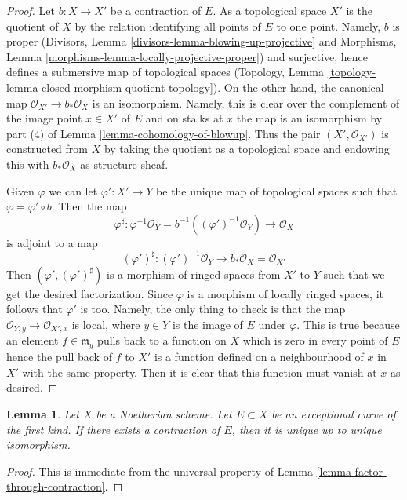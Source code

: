 \documentclass{stacks-project}
\theoremstyle{plain}
\newtheorem{lemma}[subsection]{Lemma}
\theoremstyle{definition}
\theoremstyle{remark}
\numberwithin{equation}{subsection}
\begin{document}
\begin{proof}
Let $b : X \to X'$ be a contraction of $E$. As a topological space
$X'$ is the quotient of $X$ by the relation identifying all points
of $E$ to one point. Namely, $b$ is proper
(Divisors, Lemma \ref{divisors-lemma-blowing-up-projective} and
Morphisms, Lemma \ref{morphisms-lemma-locally-projective-proper})
and surjective, hence defines a submersive map of topological
spaces (Topology, Lemma
\ref{topology-lemma-closed-morphism-quotient-topology}).
On the other hand, the canonical map
$\mathcal{O}_{X'} \to b_*\mathcal{O}_X$ is an isomorphism. Namely,
this is clear over the complement of the image point $x \in X'$ of $E$
and on stalks at $x$ the map is an isomorphism by part (4) of
Lemma \ref{lemma-cohomology-of-blowup}.
Thus the pair $(X', \mathcal{O}_{X'})$ is constructed
from $X$ by taking the quotient as a topological space
and endowing this with $b_*\mathcal{O}_X$ as structure sheaf.

\medskip\noindent
Given $\varphi$ we can let $\varphi' : X' \to Y$ be the unique map of
topological spaces such that $\varphi = \varphi' \circ b$.
Then the map
$$
\varphi^\sharp : \varphi^{-1}\mathcal{O}_Y =
b^{-1}((\varphi')^{-1}\mathcal{O}_Y) \to \mathcal{O}_X
$$
is adjoint to a map
$$
(\varphi')^\sharp :
(\varphi')^{-1}\mathcal{O}_Y \to b_*\mathcal{O}_X = \mathcal{O}_{X'}
$$
Then $(\varphi', (\varphi')^\sharp)$ is a morphism of ringed spaces
from $X'$ to $Y$ such that we get the desired factorization. Since
$\varphi$ is a morphism of locally ringed spaces, it follows that
$\varphi'$ is too. Namely, the only thing to check is that the map
$\mathcal{O}_{Y, y} \to \mathcal{O}_{X', x}$ is local, where $y \in Y$
is the image of $E$ under $\varphi$. This is true because an element
$f \in \mathfrak m_y$ pulls back to a function on $X$ which is zero
in every point of $E$ hence the pull back of $f$ to $X'$ is a function
defined on a neighbourhood of $x$ in $X'$ with the same property.
Then it is clear that this function must vanish at $x$ as desired.
\end{proof}

\begin{lemma}
\label{lemma-contraction-unique}
Let $X$ be a Noetherian scheme. Let $E \subset X$ be an
exceptional curve of the first kind. If there exists a contraction
of $E$, then it is unique up to unique isomorphism.
\end{lemma}

\begin{proof}
This is immediate from the universal property of
Lemma \ref{lemma-factor-through-contraction}.
\end{proof}
\end{document}
